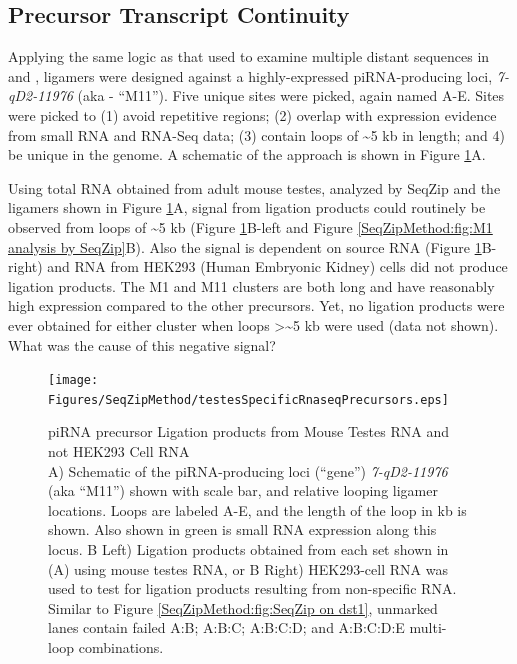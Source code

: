  \subsection{Precursor Transcript Continuity}
    \label{SeqZipMethod:sec:piRNA precursor by SeqZip}

    Applying the same logic as that used to examine multiple distant sequences in \dst{} and \fn{}, ligamers were designed against a highly-expressed piRNA-producing loci, \textit{7-qD2-11976} (aka - ``M11''). Five unique sites were picked, again named A-E. Sites were picked to (1) avoid repetitive regions; (2) overlap with expression evidence from small RNA and RNA-Seq data; (3) contain loops of \textasciitilde5 kb in length; and 4) be unique in the genome. A schematic of the approach is shown in Figure \ref{SeqZipMethod:fig:Precursors are testes-specific}A.

    Using total RNA obtained from adult mouse testes, analyzed by SeqZip and the ligamers shown in Figure \ref{SeqZipMethod:fig:Precursors are testes-specific}A, signal from ligation products could routinely be observed from loops of \textasciitilde5 kb (Figure \ref{SeqZipMethod:fig:Precursors are testes-specific}B-left and Figure \ref{SeqZipMethod:fig:M1 analysis by SeqZip}B). Also the signal is dependent on source RNA (Figure \ref{SeqZipMethod:fig:Precursors are testes-specific}B-right) and RNA from HEK293 (Human Embryonic Kidney) cells did not produce ligation products. The M1 and M11 clusters are both long and have reasonably high expression compared to the other precursors. Yet, no ligation products were ever obtained for either cluster when loops >\textasciitilde5 kb were used (data not shown). What was the cause of this negative signal?

    \begin{figure} %
        \centering 
        \texttt{[image: Figures/SeqZipMethod/testesSpecificRnaseqPrecursors.eps]}
        \caption[piRNA precursor Ligation products from Mouse Testes RNA and not HEK293 Cell RNA]
        {
          piRNA precursor Ligation products from Mouse Testes RNA and not HEK293 Cell RNA\\[0.25cm]
          A) Schematic of the piRNA-producing loci (``gene'') \textit{7-qD2-11976} (aka ``M11'') shown with scale bar, and relative looping ligamer locations.  Loops are labeled A-E, and the length of the loop in kb is shown.  Also shown in green is small RNA expression along this locus. B Left) Ligation products obtained from each set shown in (A) using mouse testes RNA, or B Right) HEK293-cell RNA was used to test for ligation products resulting from non-specific RNA. Similar to Figure \ref{SeqZipMethod:fig:SeqZip on dst1}, unmarked lanes contain failed A:B; A:B:C; A:B:C:D; and A:B:C:D:E multi-loop combinations.
        	}
        \label{SeqZipMethod:fig:Precursors are testes-specific}
      	\end{figure}

